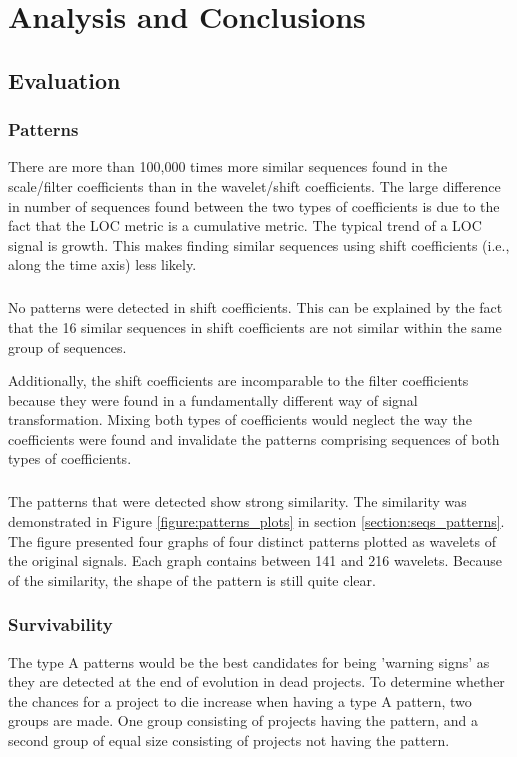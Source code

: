 \chapter{Analysis and Conclusions}
\label{analysis}

\section{Evaluation}
\subsection{Patterns}
\label{section:pattern_evaluation}
There are more than 100,000 times more similar sequences found in the
scale/filter coefficients than in the wavelet/shift coefficients. The large
difference in number of sequences found between the two types of coefficients
is due to the fact that the LOC metric is a cumulative metric. The typical
trend of a LOC signal is growth. This makes finding similar sequences using
shift coefficients (i.e., along the time axis) less likely.

\paragraph{}
No patterns were detected in shift coefficients. This can be explained by the
fact that the 16 similar sequences in shift coefficients are not similar within
the same group of sequences.

Additionally, the shift coefficients are incomparable to the filter coefficients
because they were found in a fundamentally different way of signal
transformation. Mixing both types of coefficients would neglect the way the
coefficients were found and invalidate the patterns comprising sequences of
both types of coefficients.

\paragraph{}
The patterns that were detected show strong similarity. The similarity was
demonstrated in Figure \ref{figure:patterns_plots} in section
\ref{section:seqs_patterns}. The figure presented four graphs of four distinct
patterns plotted as wavelets of the original signals. Each graph contains
between 141 and 216 wavelets. Because of the similarity, the shape of the
pattern is still quite clear.

\subsection{Survivability}
\label{section:kp_survival}
The type A patterns would be the best candidates for being 'warning signs' as
they are detected at the end of evolution in dead projects. To determine
whether the chances for a project to die increase when having a type A pattern,
two groups are made. One group consisting of projects having the pattern, and
a second group of equal size consisting of projects not having the pattern.

